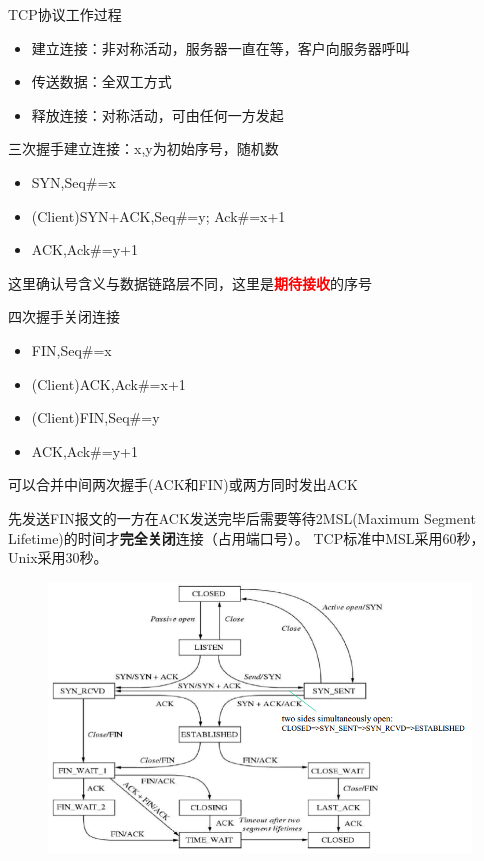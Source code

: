 TCP协议工作过程
\begin{center}
\end{center}
\begin{itemize}
    \item 建立连接：非对称活动，服务器一直在等，客户向服务器呼叫
    \item 传送数据：全双工方式
    \item 释放连接：对称活动，可由任何一方发起
\end{itemize}

三次握手建立连接：x,y为初始序号，随机数
\begin{itemize}
    \item SYN,Seq\#=x
    \item (Client)SYN+ACK,Seq\#=y; Ack\#=x+1
    \item ACK,Ack\#=y+1
\end{itemize}
这里确认号含义与数据链路层不同，这里是\textcolor{red}{\textbf{期待接收}}的序号

四次握手关闭连接
\begin{itemize}
    \item FIN,Seq\#=x
    \item (Client)ACK,Ack\#=x+1
    \item (Client)FIN,Seq\#=y
    \item ACK,Ack\#=y+1
\end{itemize}
可以合并中间两次握手(ACK和FIN)或两方同时发出ACK

先发送FIN报文的一方在ACK发送完毕后需要等待2MSL(Maximum Segment Lifetime)的时间才\textbf{完全关闭}连接（占用端口号）。 TCP标准中MSL采用60秒， Unix采用30秒。
\begin{figure}[H]
    \centering
    \includegraphics[width=0.8\linewidth]{fig/TCP-transition.PNG}
\end{figure}

